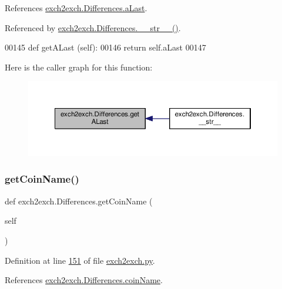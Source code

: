 References \hyperlink{exch2exch_8py_source_l00124}{exch2exch.\+Differences.\+a\+Last}.



Referenced by \hyperlink{exch2exch_8py_source_l00154}{exch2exch.\+Differences.\+\_\+\+\_\+str\+\_\+\+\_\+()}.


\begin{DoxyCode}
00145     \textcolor{keyword}{def }getALast (self):
00146         \textcolor{keywordflow}{return} self.aLast
00147         
\end{DoxyCode}
Here is the caller graph for this function\+:
\nopagebreak
\begin{figure}[H]
\begin{center}
\leavevmode
\includegraphics[width=350pt]{classexch2exch_1_1_differences_ae65d1f91ffad5d587a564d7160263b83_icgraph}
\end{center}
\end{figure}
\mbox{\label{classexch2exch_1_1_differences_a27c3904cedfe6f58d750591c1f7c7879}} 
\subsubsection{\texorpdfstring{get\+Coin\+Name()}{getCoinName()}}
{\footnotesize\ttfamily def exch2exch.\+Differences.\+get\+Coin\+Name (\begin{DoxyParamCaption}\item[{}]{self }\end{DoxyParamCaption})}



Definition at line \hyperlink{exch2exch_8py_source_l00151}{151} of file \hyperlink{exch2exch_8py_source}{exch2exch.\+py}.



References \hyperlink{exch2exch_8py_source_l00112}{exch2exch.\+Differences.\+coin\+Name}.



